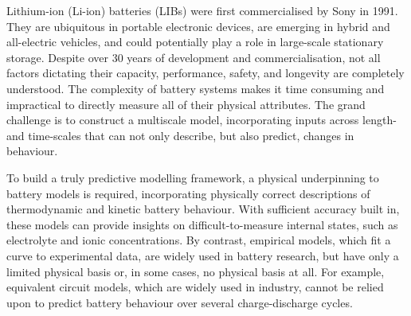 \documentclass[../main.tex]{subfiles}
\begin{document}









Lithium-ion (Li-ion) batteries (LIBs) were first commercialised by Sony in 1991. \cite{zeng2019commercialization} They are ubiquitous in portable electronic devices, are emerging in hybrid and all-electric vehicles, \cite{Goodenough2010} and could potentially play a role in large-scale stationary storage. \cite{kubiak2017calendar} Despite over 30 years of development and commercialisation, not all factors dictating their capacity, performance, safety, and longevity are completely understood. The complexity of battery systems makes it time consuming and impractical to directly measure all of their physical attributes. The grand challenge is to construct a multiscale model, incorporating inputs across length- and time-scales that can not only describe, but also predict, changes in behaviour.

To build a truly predictive modelling framework, a physical underpinning to battery models is required, incorporating physically correct descriptions of thermodynamic and kinetic battery behaviour. With sufficient accuracy built in, these models can provide insights on difficult-to-measure internal states, such as electrolyte and ionic concentrations. By contrast, empirical models, which fit a curve to experimental data, are widely used in battery research, but have only a limited physical basis or, in some cases, no physical basis at all. For example, equivalent circuit models, which are widely used in industry, cannot be relied upon to predict battery behaviour over several charge-discharge cycles.
\end{document}
